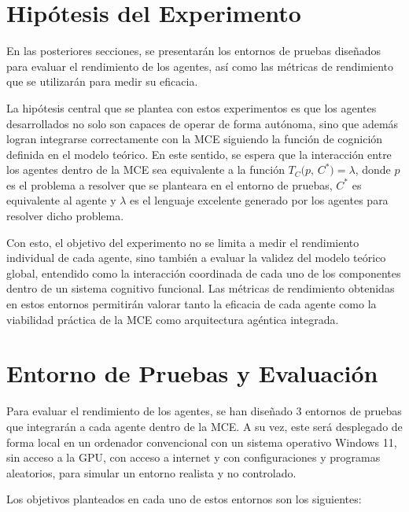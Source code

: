 \section{Hipótesis del Experimento}
En las posteriores secciones, se presentarán los entornos de pruebas
diseñados para evaluar el rendimiento de los agentes, así como las métricas
de rendimiento que se utilizarán para medir su eficacia. 

La hipótesis central que se plantea con estos experimentos es que los agentes
desarrollados no solo son capaces de operar de forma autónoma, sino que además
logran integrarse correctamente con la MCE siguiendo la función de cognición 
definida en el modelo teórico. En este sentido, se espera que la interacción 
entre los agentes dentro de la MCE sea equivalente a la función
\(T_C\bigl(p,\,C^*\bigr) = \lambda\), donde \(p\) es el problema a resolver que se
planteara en el entorno de pruebas, \(C^*\) es equivalente al agente
y \(\lambda\) es el lenguaje excelente generado por los agentes para resolver dicho
problema. 


Con esto, el objetivo del experimento no se limita a medir el rendimiento 
individual de cada agente, sino también a evaluar la validez del modelo 
teórico global, entendido como la interacción coordinada de cada uno de los componentes 
dentro de un sistema cognitivo funcional. Las métricas de rendimiento 
obtenidas en estos entornos permitirán valorar tanto la eficacia de cada agente 
como la viabilidad práctica de la MCE como arquitectura agéntica integrada.

\section{Entorno de Pruebas y Evaluación}
Para evaluar el rendimiento de los agentes, se han diseñado 3 entornos
de pruebas que integrarán a cada agente dentro de la MCE. A su vez, este
será desplegado de forma local en un ordenador convencional con un sistema
operativo Windows 11, sin acceso a la GPU, con acceso a internet y
con configuraciones y programas aleatorios, para simular un entorno realista y 
no controlado.

Los objetivos planteados en cada uno de estos entornos son los siguientes:

